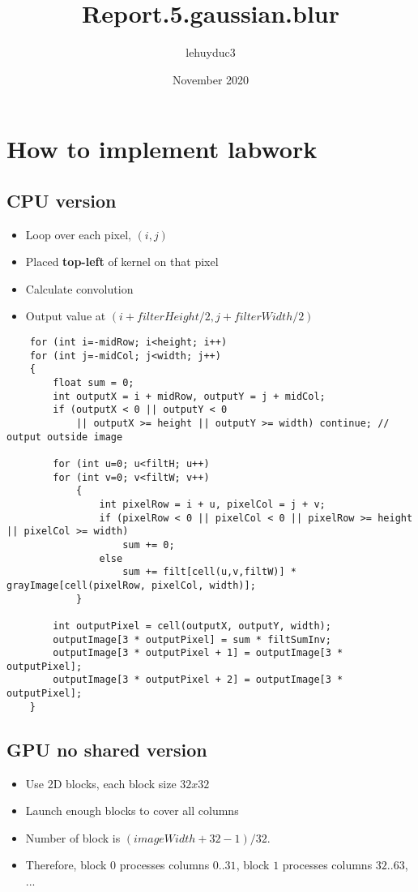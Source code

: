 \documentclass[14pt]{article}
\title{Report.5.gaussian.blur}
\author{lehuyduc3 }
\date{November 2020}
\begin{document}
\maketitle

\section{How to implement labwork}
\subsection{CPU version}
\begin{itemize}
    \item Loop over each pixel, $(i,j)$
    \item Placed \textbf{top-left} of kernel on that pixel
    \item Calculate convolution
    \item {Output value at $(i + filterHeight / 2, j + filterWidth / 2)$}
\end{itemize}

\begin{lstlisting}
	for (int i=-midRow; i<height; i++)
	for (int j=-midCol; j<width; j++)
	{
		float sum = 0;
		int outputX = i + midRow, outputY = j + midCol;
		if (outputX < 0 || outputY < 0  
		    || outputX >= height || outputY >= width) continue; // output outside image
		
		for (int u=0; u<filtH; u++)
		for (int v=0; v<filtW; v++) 
			{
				int pixelRow = i + u, pixelCol = j + v;
				if (pixelRow < 0 || pixelCol < 0 || pixelRow >= height || pixelCol >= width) 
					sum += 0;
				else 
					sum += filt[cell(u,v,filtW)] * grayImage[cell(pixelRow, pixelCol, width)];
			}
			
		int outputPixel = cell(outputX, outputY, width);
		outputImage[3 * outputPixel] = sum * filtSumInv;
		outputImage[3 * outputPixel + 1] = outputImage[3 * outputPixel];
		outputImage[3 * outputPixel + 2] = outputImage[3 * outputPixel];
    }
\end{lstlisting}

\subsection{GPU no shared version}
\begin{itemize}
    \item Use 2D blocks, each block size $32x32$
    \item Launch enough blocks to cover all columns
    \item Number of block is $(imageWidth + 32 - 1) / 32$.
    \item Therefore, block $0$ processes columns $0..31$, block $1$ processes columns $32..63$, ...
\end{itemize}
\end{document}

